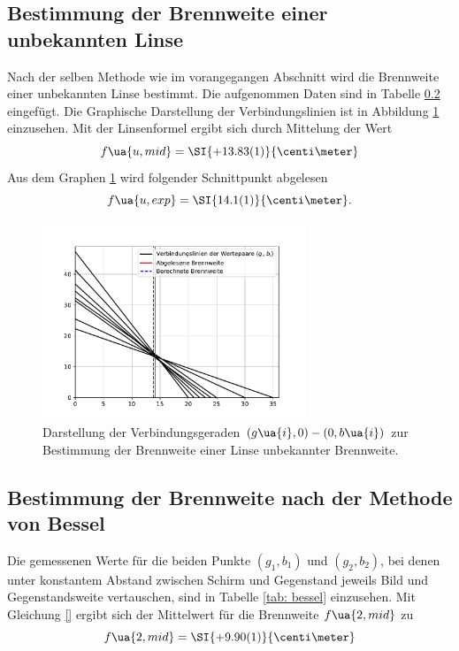 \subsection{Bestimmung der Brennweite einer unbekannten Linse}
Nach der selben Methode wie im vorangegangen Abschnitt wird die Brennweite einer unbekannten Linse bestimmt.
Die aufgenommen Daten sind in Tabelle \ref{} eingefügt. Die Graphische Darstellung der Verbindungslinien ist
in Abbildung \ref{fig: wasserlinse} einzusehen. Mit der Linsenformel ergibt sich durch Mittelung der Wert
\begin{equation}
  f\ua{u, mid} = \SI{+13.83(1)}{\centi\meter}
\end{equation}
Aus dem Graphen \ref{fig: wasserlinse} wird folgender Schnittpunkt abgelesen
\begin{equation}
  f\ua{u, exp} = \SI{14.1(1)}{\centi\meter}.
\end{equation}

\begin{figure}
  \centering
  \includegraphics[width = 0.7\textwidth]{../Messdaten/plots/wasserlinse.pdf}
  \caption{Darstellung der Verbindungsgeraden $(g\ua{i}, 0) - (0, b\ua{i})$ zur Bestimmung der Brennweite einer
  Linse unbekannter Brennweite.}
  \label{fig: wasserlinse}
\end{figure}

\subsection{Bestimmung der Brennweite nach der Methode von Bessel}
Die gemessenen Werte für die beiden Punkte $(g_1, b_1)$ und $(g_2, b_2)$, bei denen unter konstantem Abstand
zwischen Schirm und Gegenstand jeweils Bild und Gegenstandsweite
vertauschen, sind in Tabelle \ref{tab: bessel} einzusehen. Mit Gleichung \eqref{} ergibt sich der Mittelwert für
die Brennweite $f\ua{2, mid}$ zu
\begin{equation}
  f\ua{2, mid} = \SI{+9.90(1)}{\centi\meter}
  \label{eq: f_bessel}
\end{equation}

